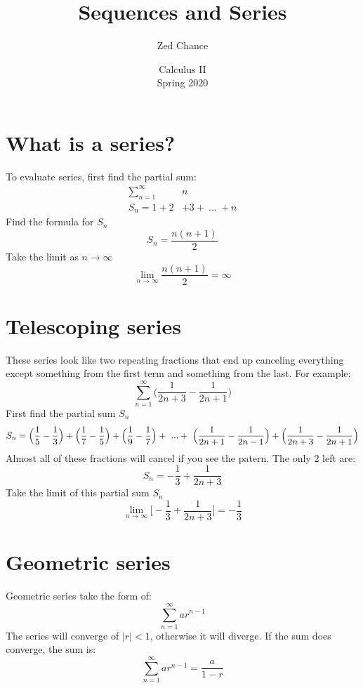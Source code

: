\documentclass{article}
\title{Sequences and Series}
\date{Calculus II\\Spring 2020}
\author{Zed Chance}
\begin{document}
\maketitle
\tableofcontents
\newpage

\section{What is a series?}
    To evaluate series, first find the partial sum:
    \begin{align*}
        \sum_{n=1}^\infty & n \\
        S_n = 1 +  2 & + 3 +\  ...\  + n
    \end{align*}
    Find the formula for $S_n$
    $$
    S_n= \frac{n(n+1)}{2}
    $$
    Take the limit as $n \rightarrow \infty$
    $$
    \lim_{n \rightarrow \infty} \frac{n(n+1)}{2} = \infty
    $$

\section{Telescoping series}
    These series look like two repeating fractions that end up canceling everything except something from the first term and something from the last. For example:
    $$
    \sum_{n=1}^{\infty} \Big (\frac{1}{2n+3} - \frac{1}{2n+1}\Big )
    $$
    First find the partial sum $S_n$
    $$
    S_n = \Big ( \frac{1}{5}-\frac{1}{3}\Big ) + \Big ( \frac{1}{7}-\frac{1}{5}\Big ) + \Big ( \frac{1}{9}-\frac{1}{7}\Big ) + \ ...\ \\
    +\ \Big ( \frac{1}{2n+1}-\frac{1}{2n-1}\Big ) + \Big ( \frac{1}{2n+3}-\frac{1}{2n+1}\Big )
    $$
    Almost all of these fractions will cancel if you see the patern. The only 2 left are:
    $$
    S_n = - \frac{1}{3} + \frac{1}{2n+3}
    $$
    Take the limit of this partial sum $S_n$
    $$
    \lim_{n \rightarrow \infty}\big[ - \frac{1}{3} + \frac{1}{2n+3} \big] = - \frac{1}{3}
    $$

\section{Geometric series}
    Geometric series take the form of:
    $$\sum_{n=1}^\infty ar^{n-1}$$
    The series will converge of $\big|r\big|< 1$, otherwise it will diverge.
    If the sum does converge, the sum is:
    $$\sum_{n=1}^\infty ar^{n-1} = \frac{a}{1-r}$$
\end{document}
